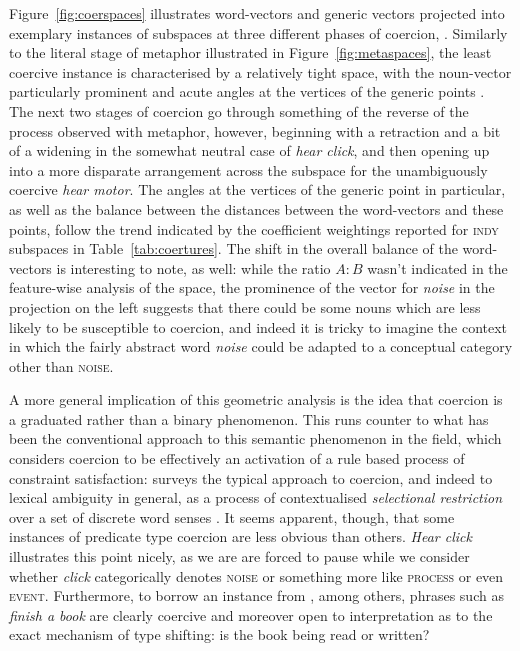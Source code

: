 Figure~\ref{fig:coerspaces} illustrates word-vectors and generic vectors projected into exemplary instances of subspaces at three different phases of coercion, .  Similarly to the literal stage of metaphor illustrated in Figure~\ref{fig:metaspaces}, the least coercive instance is characterised by a relatively tight space, with the noun-vector particularly prominent and acute angles at the vertices of the generic points .  The next two stages of coercion go through something of the reverse of the process observed with metaphor, however, beginning with a retraction and a bit of a widening in the somewhat neutral case of \emph{hear click}, and then opening up into a more disparate arrangement across the subspace for the unambiguously coercive \emph{hear motor}.  The angles at the vertices of the generic point in particular, as well as the balance between the distances between the word-vectors and these points, follow the trend indicated by the coefficient weightings reported for \textsc{indy} subspaces in Table~\ref{tab:coertures}.  The shift in the overall balance of the word-vectors is interesting to note, as well: while the ratio $A:B$ wasn't indicated in the feature-wise analysis of the space, the prominence of the vector for \emph{noise} in the projection on the left suggests that there could be some nouns which are less likely to be susceptible to coercion, and indeed it is tricky to imagine the context in which the fairly abstract word \emph{noise} could be adapted to a conceptual category other than \textsc{noise}.

A more general implication of this geometric analysis is the idea that coercion is a graduated rather than a binary phenomenon.  This runs counter to what has been the conventional approach to this semantic phenomenon in the field, which considers coercion to be effectively an activation of a rule based process of constraint satisfaction: \cite{Pustejovsky1993} surveys the typical approach to coercion, and indeed to lexical ambiguity in general, as a process of contextualised \emph{selectional restriction} over a set of discrete word senses \citep[though see][for computational applications of a probabilistic, corpus based model]{LapataEA2003,ShutovaEA2013b}.  It seems apparent, though, that some instances of predicate type coercion are less obvious than others.  \emph{Hear click} illustrates this point nicely, as we are are forced to pause while we consider whether \emph{click} categorically denotes \textsc{noise} or something more like \textsc{process} or even \textsc{event}.  Furthermore, to borrow an instance from \cite{CopestakeEA1995}, among others, phrases such as \emph{finish a book} are clearly coercive and moreover open to interpretation as to the exact mechanism of type shifting: is the book being read or written?


